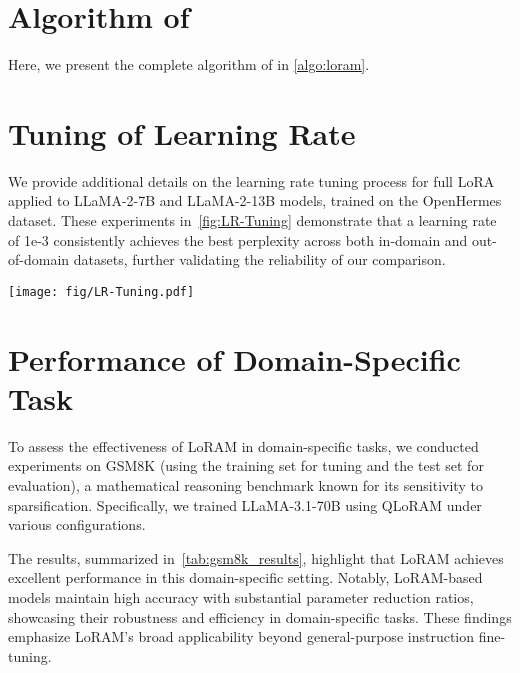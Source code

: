 \clearpage
\section{Algorithm of \method}
\label{alg:loram}
Here, we present the complete algorithm of \method in \cref{algo:loram}.





\clearpage

\section{{Tuning of Learning Rate}}
\label{apd:detail_lr}
{We provide additional details on the learning rate tuning process for full LoRA applied to LLaMA-2-7B and LLaMA-2-13B models, trained on the OpenHermes dataset. These experiments in~\cref{fig:LR-Tuning} demonstrate that a learning rate of 1e-3 consistently achieves the best perplexity across both in-domain and out-of-domain datasets, further validating the reliability of our comparison.}

\begin{figure*}[ph]
\begin{center}
\texttt{[image: fig/LR-Tuning.pdf]}
\caption{
{Learning rate tuning for LLaMA-2-7B and LLaMA-2-13B on OpenHermes using LoRA.}
}
\label{fig:LR-Tuning}
\end{center}
\end{figure*}

\section{{Performance of Domain-Specific Task}}

{To assess the effectiveness of LoRAM in domain-specific tasks, we conducted experiments on GSM8K (using the training set for tuning and the test set for evaluation), a mathematical reasoning benchmark known for its sensitivity to sparsification. Specifically, we trained LLaMA-3.1-70B using QLoRAM under various configurations.}

{The results, summarized in~\cref{tab:gsm8k_results}, highlight that LoRAM achieves excellent performance in this domain-specific setting. Notably, LoRAM-based models maintain high accuracy with substantial parameter reduction ratios, showcasing their robustness and efficiency in domain-specific tasks. These findings emphasize LoRAM's broad applicability beyond general-purpose instruction fine-tuning.}

